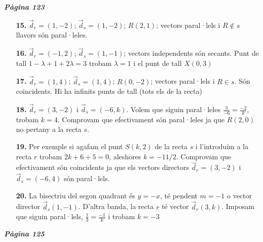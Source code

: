 \documentclass[a4paper, pdf, twoside]{book}
\begin{document}
\begin{multicols}{2}

{\textbf{\em Pàgina 123}} \hrulefill
\begin{enumerate}
\vspace{0.25cm}
\item[\fontfamily{phv}\selectfont\color{blue}\textbf{15. }] 
$\vec d_r=(1,-2)$; $\vec d_s=(1,-2)$; $R(2,1)$; vectors paral·lels i $R\notin s$ llavors són paral·leles.
 \end{enumerate}
\begin{enumerate}
\vspace{0.25cm}
\item[\fontfamily{phv}\selectfont\color{blue}\textbf{16. }] 
$\vec d_r=(-1,2)$; $\vec d_s=(1,-1)$; vectors independents són secants. Punt de tall $1-\lambda +1+2\lambda =3$ trobam $\lambda =1$ i el punt de tall $X(0,3)$ 
\vspace{0.25cm}
\item[\fontfamily{phv}\selectfont\color{blue}\textbf{17. }] 
$\vec d_r=(1,4)$; $\vec d_s=(1,4)$; $R(0,-2)$; vectors paral·lels i $R\in s$. Són coincidents. Hi ha infinits punts de tall (tots els de la recta)
\vspace{0.25cm}
\item[\fontfamily{phv}\selectfont\color{blue}\textbf{18. }] 
$\vec d_r=(3,-2)$ i $\vec d_s=(-6,k)$. Volem que siguin paral·leles $\frac {3}{-6}=\frac {-2}{k}$, trobam $k=4$. Comprovam que efectivament són paral·leles ja que $R(2,0)$ no pertany a la recta $s$.
\vspace{0.25cm}
\item[\fontfamily{phv}\selectfont\color{blue}\textbf{19. }] 
Per exemple si agafam el punt $S(k,2)$ de la recta $s$ i l'introduïm a la recta $r$ trobam $2k+6+5=0$, aleshores $k=-11/2$. Comprovam que efectivament són coincidents ja que els vectors directors $\vec d_r =(3,-2)$ i $\vec d_s=(-6,4)$ són paral·lels.
\vspace{0.25cm}
\item[\fontfamily{phv}\selectfont\color{blue}\textbf{20. }] 
La bisectriu del segon quadrant és $y=-x$, té pendent $m=-1$ o vector director $\vec d_s(1,-1)$. D'altra banda, la recta $r$ té vector $\vec d_r (3,k)$. Imposam que siguin paral·lels, $\frac {1}{3}=\frac {-1}{k}$ i trobam $k=-3$ 
 \end{enumerate}
\vspace{0.3cm}


{\textbf{\em Pàgina 125}} \hrulefill
\begin{enumerate}
\vspace{0.25cm}



\end{enumerate}
\end{multicols}
\end{document}
